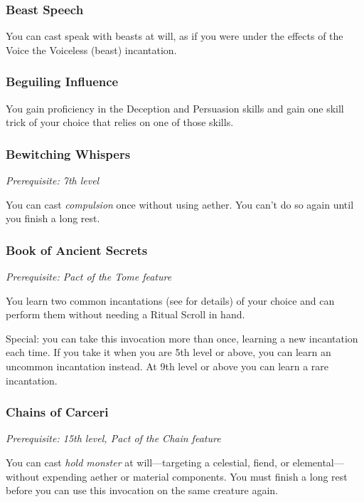 \subsubsection{Beast Speech}

You can cast speak with beasts at will, as if you were under the effects of the Voice the Voiceless (beast) incantation.

\subsubsection{Beguiling Influence}

You gain proficiency in the Deception and Persuasion skills and gain one skill trick of your choice that relies on one of those skills.

\subsubsection{Bewitching Whispers}

\textit{Prerequisite: 7th level}

You can cast \textit{compulsion} once without using aether. You can't do so again until you finish a long rest.

\subsubsection{Book of Ancient Secrets}

\textit{Prerequisite: Pact of the Tome feature}

You learn two common incantations (see  for details) of your choice and can perform them without needing a Ritual Scroll in hand.

Special: you can take this invocation more than once, learning a new incantation each time. If you take it when you are 5th level or above, you can learn an uncommon incantation instead. At 9th level or above you can learn a rare incantation.

\subsubsection{Chains of Carceri}

\textit{Prerequisite: 15th level, Pact of the Chain feature}

You can cast \textit{hold monster} at will—targeting a celestial, fiend, or elemental—without expending aether or material components. You must finish a long rest before you can use this invocation on the same creature again.

